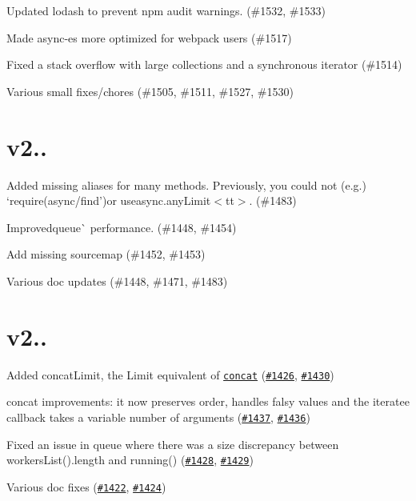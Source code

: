 
\begin{DoxyItemize}
\item Updated lodash to prevent {\ttfamily npm audit} warnings. (\#1532, \#1533)
\item Made {\ttfamily async-\/es} more optimized for webpack users (\#1517)
\item Fixed a stack overflow with large collections and a synchronous iterator (\#1514)
\item Various small fixes/chores (\#1505, \#1511, \#1527, \#1530)
\end{DoxyItemize}

\section*{v2..}


\begin{DoxyItemize}
\item Added missing aliases for many methods. Previously, you could not (e.\+g.) `require(\textquotesingle{}async/find'){\ttfamily or use}async.\+any\+Limit$<$tt$>$. (\#1483)
\item Improvedqueue\`{} performance. (\#1448, \#1454)
\item Add missing sourcemap (\#1452, \#1453)
\item Various doc updates (\#1448, \#1471, \#1483)
\end{DoxyItemize}

\section*{v2..}


\begin{DoxyItemize}
\item Added {\ttfamily concat\+Limit}, the {\ttfamily Limit} equivalent of \href{https://caolan.github.io/async/docs.html#concat}{\tt {\ttfamily concat}} (\href{https://github.com/caolan/async/issues/1426}{\tt \#1426}, \href{https://github.com/caolan/async/pull/1430}{\tt \#1430})
\item {\ttfamily concat} improvements\+: it now preserves order, handles falsy values and the {\ttfamily iteratee} callback takes a variable number of arguments (\href{https://github.com/caolan/async/issues/1437}{\tt \#1437}, \href{https://github.com/caolan/async/pull/1436}{\tt \#1436})
\item Fixed an issue in {\ttfamily queue} where there was a size discrepancy between {\ttfamily workers\+List().length} and {\ttfamily running()} (\href{https://github.com/caolan/async/issues/1428}{\tt \#1428}, \href{https://github.com/caolan/async/pull/1429}{\tt \#1429})
\item Various doc fixes (\href{https://github.com/caolan/async/issues/1422}{\tt \#1422}, \href{https://github.com/caolan/async/pull/1424}{\tt \#1424})
\end{DoxyItemize}

